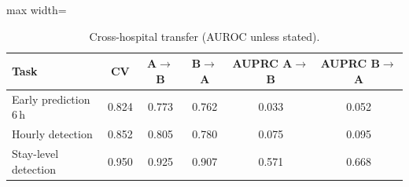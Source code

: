 \begin{table}[!t]
\centering\footnotesize\setlength{\tabcolsep}{3pt}
\caption{Cross-hospital transfer (AUROC unless stated).}
\label{tab:transfer}
\begin{adjustbox}{max width=\linewidth}
\begin{tabular}{lccccc}
\toprule
Task & CV & A$\to$B & B$\to$A & AUPRC A$\to$B & AUPRC B$\to$A \\
\midrule
Early prediction 6\,h & 0.824 & 0.773 & 0.762 & 0.033 & 0.052 \\
Hourly detection & 0.852 & 0.805 & 0.780 & 0.075 & 0.095 \\
Stay-level detection & 0.950 & 0.925 & 0.907 & 0.571 & 0.668 \\
\bottomrule
\end{tabular}
\end{adjustbox}
\end{table}
